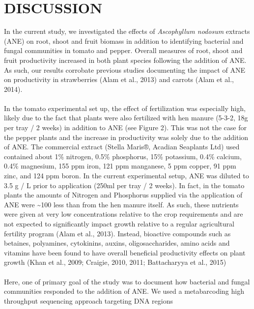 \documentclass[11pt,]{article}
\begin{document}
\newpage  

\section{DISCUSSION}\label{discussion}

In the current study, we investigated the effects of \emph{Ascophyllum
nodosum} extracts (ANE) on root, shoot and fruit biomass in addition to
identifying bacterial and fungal communities in tomato and pepper.
Overall measures of root, shoot and fruit productivity increased in both
plant species following the addition of ANE. As such, our results
corrobate previous studies documenting the impact of ANE on productivity
in strawberries (Alam et al., 2013) and carrots (Alam et al., 2014).\\
\hspace*{0.333em}\\
In the tomato experimental set up, the effect of fertilization was
especially high, likely due to the fact that plants were also fertilized
with hen manure (5-3-2, 18g per tray / 2 weeks) in addition to ANE (see
Figure 2). This was not the case for the pepper plants and the increase
in productivity was solely due to the addition of ANE. The commercial
extract (Stella Maris®, Acadian Seaplants Ltd) used contained about 1\%
nitrogen, 0.5\% phosphorus, 15\% potassium, 0.4\% calcium, 0.4\%
magnesium, 155 ppm iron, 121 ppm manganese, 5 ppm copper, 91 ppm zinc,
and 124 ppm boron. In the current experimental setup, ANE was diluted to
3.5 g / L prior to application (250ml per tray / 2 weeks). In fact, in
the tomato plants the amounts of Nitrogen and Phosphorus supplied via
the application of ANE were \textasciitilde{}100 less than from the hen
manure itself. As such, these nutrients were given at very low
concentrations relative to the crop requirements and are not expected to
significantly impact growth relative to a regular agricultural fertility
program (Alam et al., 2013). Instead, bioactive compounds such as
betaines, polyamines, cytokinins, auxins, oligosaccharides, amino acids
and vitamins have been found to have overall beneficial productivity
effects on plant growth (Khan et al., 2009; Craigie, 2010, 2011;
Battacharyya et al., 2015)\\
\hspace*{0.333em}\\
Here, one of primary goal of the study was to document how bacterial and
fungal communities responded to the addition of ANE. We used a
metabarcoding high throughput sequencing approach targeting DNA regions
\end{document}
